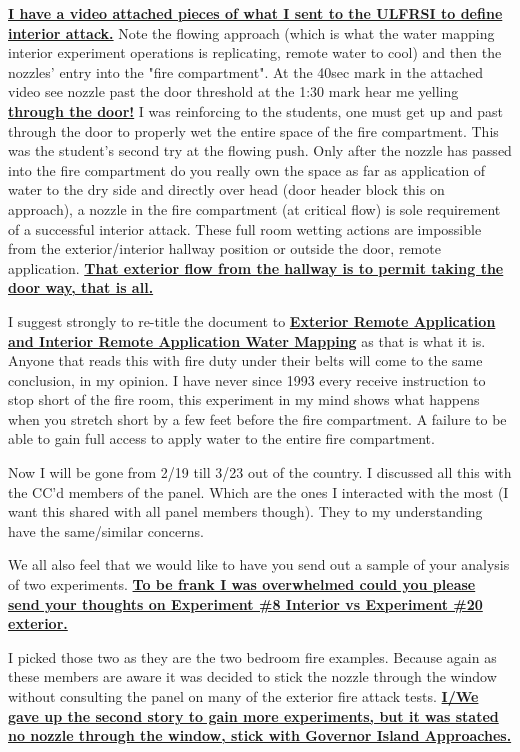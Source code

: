\documentclass[12pt,oneside]{book}
\begin{document}
\begin{appendix}
\textbf{\ul{I have a video attached pieces of what I sent to the ULFRSI to define interior attack.}}  Note the flowing approach (which is what the water mapping interior experiment operations is replicating, remote water to cool) and then the nozzles' entry into the "fire compartment".  At the 40sec mark in the attached video see nozzle past the door threshold at the 1:30 mark hear me yelling \textbf{\ul{through the door!}}  I was reinforcing to the students, one must get up and past through the door to properly wet the entire space of the fire compartment.   This was the student's second try at the flowing push.  Only after the nozzle has passed into the fire compartment do you really own the space as far as application of water to the dry side and directly over head (door header block this on approach), a nozzle in the fire compartment (at critical flow) is sole requirement of a successful interior attack.  These full room wetting actions are impossible from the exterior/interior hallway position or outside the door, remote application.  \textbf{\ul{That exterior flow from the hallway is to permit taking the door way, that is all.}} 

I suggest strongly to re-title the document to \textbf{\ul{Exterior Remote Application and Interior Remote Application Water Mapping}} as that is what it is.  Anyone that reads this with fire duty under their belts will come to the same conclusion, in my opinion.  I have never since 1993 every receive instruction to stop short of the fire room, this experiment in my mind shows what happens when you stretch short by a few feet before the fire compartment.  A failure to be able to gain full access to apply water to the entire fire compartment.    

Now I will be gone from 2/19 till 3/23 out of the country.  I discussed all this with the CC'd members of the panel.  Which are the ones I interacted with the most  (I want this shared with all panel members though).  They to my understanding have the same/similar concerns.  

We all also feel that we would like to have you send out a sample of your analysis of two experiments.  \textbf{\ul{To be frank I was overwhelmed could you please send your thoughts on Experiment \#8 Interior vs  Experiment \#20 exterior.}}  

I picked those two as they are the two bedroom fire examples.  Because again as these members are aware it was decided to stick the nozzle through the window without consulting the panel on many of the exterior fire attack tests.  \textbf{\ul{I/We gave up the second story to gain more experiments, but it was stated no nozzle through the window, stick with Governor Island Approaches.}}  


\end{appendix}
\end{document}
